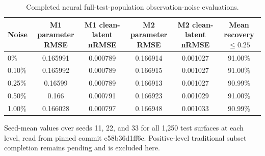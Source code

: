 \begin{table}[htbp]
\centering
\caption{Completed neural full-test-population observation-noise evaluations.}
\label{tab:completed-neural-noise}
\begin{tabular}{lccccc}
\toprule
Noise & M1 parameter RMSE & M1 clean-latent nRMSE & M2 parameter RMSE & M2 clean-latent nRMSE & Mean recovery $\leq0.25$ \\
\midrule
0\% & 0.165991 & 0.000789 & 0.166914 & 0.001027 & 91.00\% \\
0.10\% & 0.165992 & 0.000789 & 0.166915 & 0.001027 & 91.00\% \\
0.25\% & 0.16599 & 0.000789 & 0.166913 & 0.001027 & 90.99\% \\
0.50\% & 0.166 & 0.000791 & 0.166923 & 0.001029 & 91.00\% \\
1.00\% & 0.166028 & 0.000797 & 0.166948 & 0.001033 & 90.99\% \\
\bottomrule
\end{tabular}
\par\vspace{0.35em}
\begin{minipage}{0.94\linewidth}\small Seed-mean values over seeds 11, 22, and 33 for all 1,250 test surfaces at each level, read from pinned commit e58b36d1ff6c. Positive-level traditional subset completion remains pending and is excluded here.\end{minipage}
\end{table}
